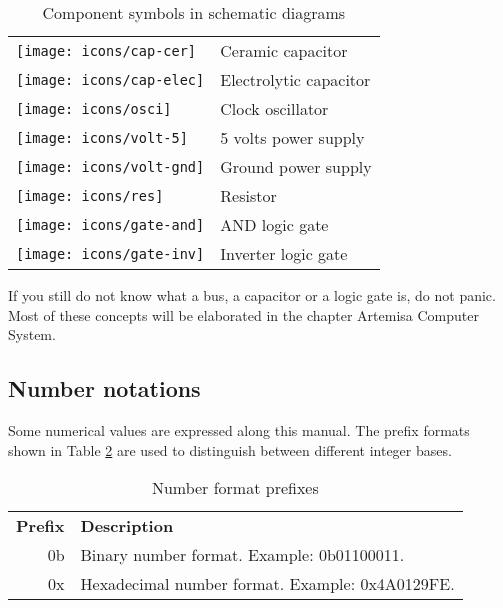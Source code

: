 \begin{table}[h!]
	\centering
	\begin{tabular}{ m{22mm}|l }	
		\centering\texttt{[image: icons/cap-cer]} & Ceramic capacitor\\
		\centering\texttt{[image: icons/cap-elec]} & Electrolytic capacitor\\
		\centering\texttt{[image: icons/osci]} & Clock oscillator\\
		\centering\texttt{[image: icons/volt-5]} & 5 volts power supply\\
		\centering\texttt{[image: icons/volt-gnd]} & Ground power supply\\
		\centering\texttt{[image: icons/res]} & Resistor\\
		\centering\texttt{[image: icons/gate-and]} & AND logic gate\\
		\centering\texttt{[image: icons/gate-inv]} & Inverter logic gate\\
	\end{tabular}
	\caption{Component symbols in schematic diagrams}
	\label{table:schematic-symbols}
\end{table}

If you still do not know what a bus, a capacitor or a logic gate is, do not panic. Most of these concepts will be elaborated in the chapter Artemisa Computer System.

\subsection{Number notations}

Some numerical values are expressed along this manual. The prefix formats shown in Table \ref{table:number-formats} are used to distinguish between different integer bases. 

\begin{table}[h!]
	\centering
	\begin{tabular}{ r|l }	
		{\bf Prefix} & {\bf Description}\\
		0b & Binary number format. Example: 0b01100011.\\
		0x & Hexadecimal number format. Example: 0x4A0129FE.\\
	\end{tabular}
	\caption{Number format prefixes}
	\label{table:number-formats}
\end{table}
